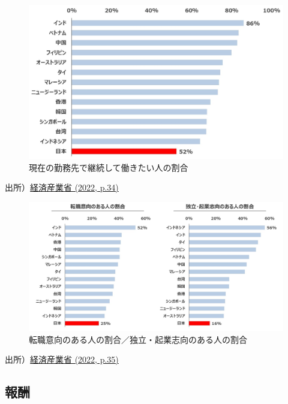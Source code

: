 \documentclass[
]{book}
\begin{document}
\begin{figure}
\includegraphics[width=960px]{miti_page-0035} \caption{現在の勤務先で継続して働きたい人の割合}\label{fig:change1}
\end{figure}

出所）\href{https://www.meti.go.jp/press/2022/05/20220531001/20220531001-1.pdf}{経済産業省 (2022, p.34)}

\begin{figure}
\includegraphics[width=960px]{miti_page-0036} \caption{転職意向のある人の割合／独立・起業志向のある人の割合}\label{fig:change2}
\end{figure}

出所）\href{https://www.meti.go.jp/press/2022/05/20220531001/20220531001-1.pdf}{経済産業省 (2022, p.35)}

\hypertarget{japan-payment}{%
\subsection{報酬}\label{japan-payment}}
\end{document}
